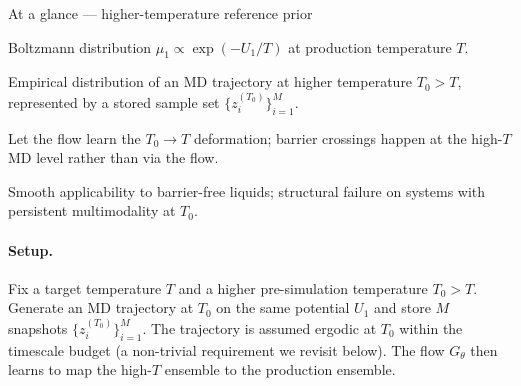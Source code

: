 \documentclass[11pt,letterpaper]{article}
\theoremstyle{plain}
\begin{document}
\begin{methodbox}{At a glance --- higher-temperature reference prior}
\begin{description}[leftmargin=2.2em,style=nextline,itemsep=0pt,topsep=2pt]
  \item[Target] Boltzmann distribution
    $\mu_1\propto\exp(-U_1/T)$ at production temperature $T$.
  \item[Prior] Empirical distribution of an MD trajectory at higher
    temperature $T_0>T$, represented by a stored sample set
    $\{z_i^{(T_0)}\}_{i=1}^M$.
  \item[New idea] Let the flow learn the $T_0\!\to\!T$ deformation;
    barrier crossings happen at the high-$T$ MD level rather than via the
    flow.
  \item[Headline] Smooth applicability to barrier-free liquids; structural
    failure on systems with persistent multimodality at $T_0$.
\end{description}
\end{methodbox}

\paragraph{Setup.} Fix a target temperature $T$ and a higher
pre-simulation temperature $T_0>T$. Generate an MD trajectory at $T_0$ on
the same potential $U_1$ and store $M$ snapshots
$\{z_i^{(T_0)}\}_{i=1}^M$. The trajectory is assumed ergodic at $T_0$
within the timescale budget (a non-trivial requirement we revisit below).
The flow $G_\theta$ then learns to map the high-$T$ ensemble to the
production ensemble.
\end{document}
